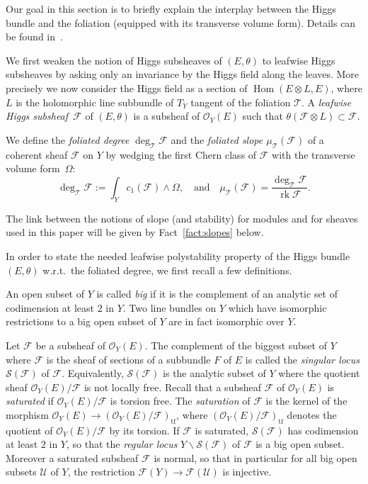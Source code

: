 \documentclass[10pt]{amsart}
\let\mathcal\mathscr
\newcommand{\citestar}[3]{\cite[#3]{#1}}
\theoremstyle{plain}
\theoremstyle{definition}
\DeclareMathOperator{\Hom}{Hom}
\DeclareMathOperator{\rk}{rk}
\newcommand{\rtf}{\mathrm{tf}}
\newcommand{\cF}{\mathcal{F}}
\newcommand{\cO}{\mathcal{O}}
\newcommand{\cS}{\mathcal{S}}
\newcommand{\cT}{\mathcal{T}}
\newcommand{\cU}{\mathcal{U}}
\begin{document}
Our goal in this section is to briefly explain the interplay between the Higgs bundle and the
foliation (equipped with its transverse volume form).
Details can be found in~\citestar{KM}*{}.

We first weaken the notion of Higgs subsheaves of $(E,\theta)$ to leafwise Higgs subsheaves by
asking only an
invariance by the Higgs field along the leaves. More \hbox{precisely} we now consider the
Higgs field as a section of $\Hom(E\otimes L,E)$,
where $L$ is the holomorphic
line subbundle of $T_Y$ tangent of the foliation $\cT$.
A \emph{leafwise Higgs subsheaf}~$\cF$ of
$(E,\theta)$ is a subsheaf of $\cO_Y(E)$ such that $\theta(\cF\otimes L)\subset \cF$.

We define the \emph{foliated degree} $\deg_\cT\cF$ and the {\em
foliated slope $\mu_\cT(\cF)$} of a coherent sheaf
$\cF$ on $Y$ by
wedging the first Chern class of $\cF$ with the transverse volume form~$\Omega$:
$$
\deg_\cT\cF:=\int_Y c_1(\cF)\wedge\Omega, \quad\mbox{and}\quad \mu_\cT(\cF)=\frac{\deg_\cT\cF}{\rk \cF}.
$$

The link between the notions of slope (and stability) for modules and for sheaves used in
this paper will be given by Fact~\ref{fact:slopes} below.

In order to state the needed leafwise polystability property of the Higgs bundle $(E,\theta)$ w.r.t.\ the
foliated degree, we first recall a few definitions.

An open subset of $Y$ is called \emph{big} if it is the complement of an analytic set of
codimension at least $2$ in $Y$. Two line bundles on $Y$ which have isomorphic restrictions
to a big open subset of $Y$ are in fact isomorphic over $Y$.

Let $\cF$ be a subsheaf of $\cO_Y(E)$. The complement of the biggest subset of $Y$ where $\cF$ is the
sheaf of sections of a subbundle $F$ of $E$ is called the \emph{singular locus} $\cS(\cF)$ of
$\cF$. Equivalently, $\cS(\cF)$ is the analytic subset of $Y$ where the quotient sheaf $\cO_Y(E)/\cF$ is not locally
free. Recall that a subsheaf $\cF$ of $\cO_Y(E)$ is \emph{saturated} if $\cO_Y(E)/\cF$ is torsion
free. The \emph{saturation} of $\cF$ is the kernel of the morphism $\cO_Y(E) \to
(\cO_Y(E)/\cF)_\rtf$, where
$(\cO_Y(E)/\cF)_\rtf$ denotes the quotient of $\cO_Y(E)/\cF$ by its torsion. If $\cF$ is
saturated, $\cS(\cF)$ has codimension at least $2$ in $Y$, so that the \emph{regular
locus} $Y\backslash\cS(\cF)$ of $\cF$ is a big open subset. Moreover a saturated subsheaf $\cF$ is
normal, so that in particular for all big open subsets $\cU$ of $Y$, the restriction
$\cF(Y)\to\cF(\cU)$ is injective.
\end{document}
